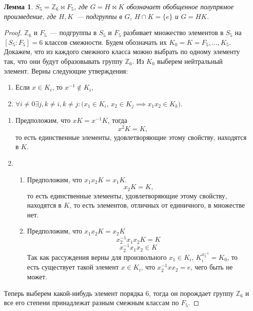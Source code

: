 \documentclass[utf8,a4paper,draft]{article}
\newtheorem{lemma_cub}{Лемма}
\begin{document}
\begin{lemma_cub}
$S_5=\mathbb{Z}_6\bowtie F_5$, где $G=H\bowtie K$ обозначает обобщенное полупрямое произведение, где $H, K$~--- подгруппы в $G$, $H\cap K=\{e\}$ и $G=HK$.
\end{lemma_cub}
\begin{proof}
$\mathbb{Z}_6$ и $F_5$~--- подгруппы в $S_5$ и $F_5$ разбивает множество элементов в $S_5$ на $[S_5:F_5]=6$ классов смежности. Будем обозначать их $K_0=K=F_5,\ldots,K_5$. Докажем, что из каждого смежного класса можно выбрать по одному элементу так, что они будут образовывать группу $\mathbb{Z}_6$. Из $K_0$ выберем нейтральный элемент. Верны следующие утверждения:
\begin{enumerate}
\item Если $x\in K_i$, то $x^{-1}\not\in K_i$,
\item $\forall i\not=0\exists j, k\not=i,k\not=j: (x_1\in K_i$, $x_2\in K_j\implies x_1x_2\in K_k)$.
\hspace{0.5cm}\\
\end{enumerate}

\begin{enumerate}
\item Предположим, что $xK=x^{-1}K$, тогда $$x^2K=K\text{,}$$ то есть единственные элементы, удовлетворяющие этому свойству, находятся в $K$.
\item
\begin{enumerate}
\item Предположим, что $x_1x_2K=x_1K$.
$$x_2K=K\text{,}$$
то есть единственные элементы, удовлетворяющие этому свойству, находятся в $K$, то есть элементов, отличных от единичного, в множестве нет.
\item Предположим, что $x_1x_2K=x_2K$
$$x_2^{-1}x_1x_2K=K$$
$$x_2^{-1}x_1x_2\in K$$
Так как рассуждения верны для произвольного $x_1\in K_i$, $K_i^{x_2^{-1}}=K_0$, то есть существует такой элемент $x\in K_i$, что $x_2^{-1}xx_2=e$, чего быть не может.
\end{enumerate}
\end{enumerate}
Теперь выберем какой-нибудь элемент порядка 6, тогда он порождает группу $\mathbb{Z}_6$ и все его степени принадлежат разным смежным классам по $F_5$.
\end{proof}
\end{document}
